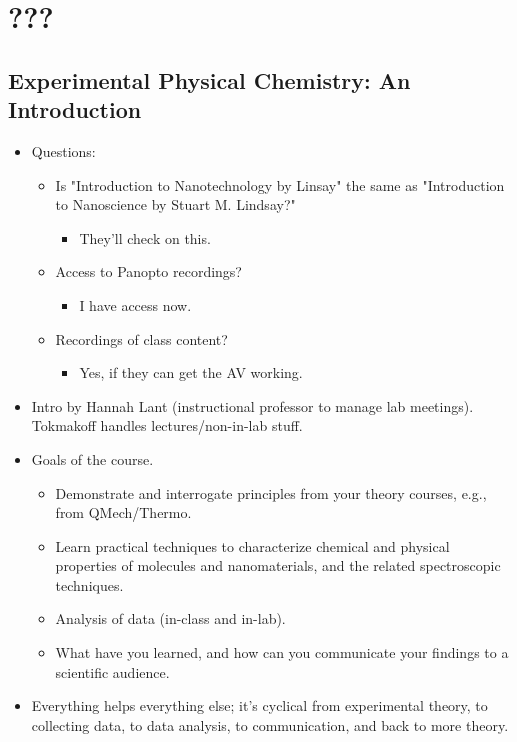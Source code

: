 \documentclass[../notes.tex]{subfiles}
\begin{document}
\chapter{???}
\section{Experimental Physical Chemistry: An Introduction}
\begin{itemize}
    \item {}Questions:
    \begin{itemize}
        \item Is "Introduction to Nanotechnology by Linsay" the same as "Introduction to Nanoscience by Stuart M. Lindsay?"
        \begin{itemize}
            \item They'll check on this.
        \end{itemize}
        \item Access to Panopto recordings?
        \begin{itemize}
            \item I have access now.
        \end{itemize}
        \item Recordings of class content?
        \begin{itemize}
            \item Yes, if they can get the AV working.
        \end{itemize}
    \end{itemize}
    \item Intro by Hannah Lant (instructional professor to manage lab meetings). Tokmakoff handles lectures/non-in-lab stuff.
    \item Goals of the course.
    \begin{itemize}
        \item Demonstrate and interrogate principles from your theory courses, e.g., from QMech/Thermo.
        \item Learn practical techniques to characterize chemical and physical properties of molecules and nanomaterials, and the related spectroscopic techniques.
        \item Analysis of data (in-class and in-lab).
        \item What have you learned, and how can you communicate your findings to a scientific audience.
    \end{itemize}
    \item Everything helps everything else; it's cyclical from experimental theory, to collecting data, to data analysis, to communication, and back to more theory.

\end{itemize}
\end{document}
